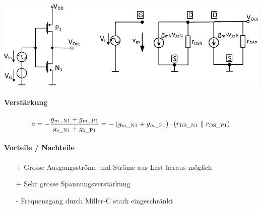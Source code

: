 \includegraphics[width=\columnwidth, align=t]{images/07_verstaerker_mit_parallelem_eingang.pdf}

\paragraph{Verstärkung}

\vspace{-0.2cm}

\[
    a = - \frac{g_{m\_ \rm N1} + g_{m\_ \rm P1}}{g_{o\_ \rm N1} + g_{0\_ \rm P1}} = - \left( g_{m\_ \rm N1} + g_{m\_ \rm P1} \right) \cdot \left( r_{\rm DS\_N1} \parallel r_{\rm DS\_P1} \right)
\]


\paragraph{Vorteile / Nachteile}

\begin{minipage}[t]{0.48\columnwidth}
    \raggedright

    \begin{itemize}
        \item[+] Grosse Ausgangsströme und Ströme aus Last heraus möglich
        \item[+] Sehr grosse Spannungsverstärkung
    \end{itemize}
\end{minipage}
\hfill
\begin{minipage}[t]{0.48\columnwidth}
    \raggedright
    \begin{itemize}
        \item[-] Frequenzgang durch Miller-C stark eingeschränkt
    \end{itemize}
\end{minipage}



